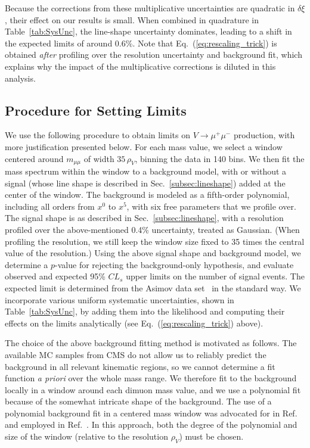 \documentclass[aps,prd,twocolumn,superscriptaddress,preprintnumbers,nofootinbib,longbibliography,floatfix]{revtex4-1}
\DeclareRobustCommand{\Sec}[1]{Sec.~\ref{#1}}
\DeclareRobustCommand{\Tab}[1]{Table~\ref{#1}}
\DeclareRobustCommand{\Eq}[1]{Eq.~(\ref{#1})}
\DeclareRobustCommand{\Ref}[1]{Ref.~\cite{#1}}
\begin{document}
Because the corrections from these multiplicative uncertainties are quadratic in $\delta \xi$, their effect on our results is small.
%
When combined in quadrature in \Tab{tab:SysUnc}, the line-shape uncertainty dominates, leading to a shift in the expected limits of around 0.6\%.
%
Note that \Eq{eq:rescaling_trick} is obtained \emph{after} profiling over the resolution uncertainty and background fit, which explains why the impact of the multiplicative corrections is diluted in this analysis.



\subsection{Procedure for Setting Limits}
\label{subsec:limit_procedure}


We use the following procedure to obtain limits on $V \to \mu^+ \mu^-$ production, with more justification presented below.
%
For each mass value, we select a window centered around $m_{\mu\mu}$ of width  $35\, \rho_V$, binning the data in  140 bins.
%
We then fit the mass spectrum within the window to a background model, with or without a signal (whose line shape is described in \Sec{subsec:lineshape}) added at the center of the window.
%
The background is modeled as a fifth-order polynomial, including all orders from $x^0$ to $x^5$, with six free parameters that we profile over.
%
The signal shape is as described in \Sec{subsec:lineshape}, with a resolution profiled over the above-mentioned 0.4\% uncertainty, treated as Gaussian.
%
(When profiling the resolution, we still keep the window size fixed to 35 times the central value of the resolution.)
%
Using the above signal shape and background model, we determine a $p$-value for rejecting the background-only hypothesis, and evaluate observed and expected 95\% $CL_s$ upper limits on the number of signal events.
%
The expected limit is determined from the Asimov data set~\cite{Cowan:2010js} in the standard way.
%
We incorporate various uniform systematic uncertainties, shown in \Tab{tab:SysUnc}, by adding them into the likelihood and computing their effects on the limits analytically (see \Eq{eq:rescaling_trick} above).


The choice of the above background fitting method is motivated as follows.
%
The available MC samples from CMS do not allow us to reliably predict the background in all relevant kinematic regions, so we cannot determine a fit function {\it a priori} over the whole mass range.
%
We therefore fit to the background locally in a window around each dimuon mass value, and we use a polynomial fit because of the somewhat intricate shape of the background.
%
The use of a polynomial background fit in a centered mass window was advocated for in \Ref{Williams:2017gwf} and employed in \Ref{Aaij:2017rft}.
%
In this approach, both the degree of the polynomial and size of the window (relative to the resolution $\rho_V$) must be chosen.
\end{document}

